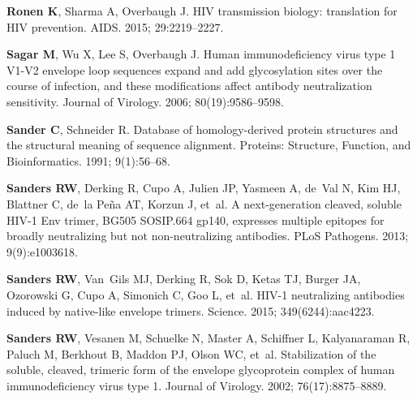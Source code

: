 \documentclass[9pt]{elife}
\begin{document}
\begin{thebibliography}{114}
\textbf{\color{eLifeMediumGrey} Ronen K}, Sharma A, Overbaugh J.
\newblock HIV transmission biology: translation for HIV prevention.
\newblock AIDS.  2015; 29:2219--2227.

\textbf{\color{eLifeMediumGrey} Sagar M}, Wu X, Lee S, Overbaugh J.
\newblock Human immunodeficiency virus type 1 {V1-V2} envelope loop sequences
  expand and add glycosylation sites over the course of infection, and these
  modifications affect antibody neutralization sensitivity.
\newblock Journal of Virology.  2006; 80(19):9586--9598.

\textbf{\color{eLifeMediumGrey} Sander C}, Schneider R.
\newblock Database of homology-derived protein structures and the structural
  meaning of sequence alignment.
\newblock Proteins: Structure, Function, and Bioinformatics.  1991;
  9(1):56--68.

\textbf{\color{eLifeMediumGrey} Sanders RW}, Derking R, Cupo A, Julien JP,
  Yasmeen A, de~Val N, Kim HJ, Blattner C, de~la Pe{\~n}a AT, Korzun J, et~al.
\newblock A next-generation cleaved, soluble {HIV-1} Env trimer, {BG505
  SOSIP.664 gp140}, expresses multiple epitopes for broadly neutralizing but
  not non-neutralizing antibodies.
\newblock PLoS Pathogens.  2013; 9(9):e1003618.

\textbf{\color{eLifeMediumGrey} Sanders RW}, Van~Gils MJ, Derking R, Sok D,
  Ketas TJ, Burger JA, Ozorowski G, Cupo A, Simonich C, Goo L, et~al.
\newblock HIV-1 neutralizing antibodies induced by native-like envelope
  trimers.
\newblock Science.  2015; 349(6244):aac4223.

\textbf{\color{eLifeMediumGrey} Sanders RW}, Vesanen M, Schuelke N, Master A,
  Schiffner L, Kalyanaraman R, Paluch M, Berkhout B, Maddon PJ, Olson WC,
  et~al.
\newblock Stabilization of the soluble, cleaved, trimeric form of the envelope
  glycoprotein complex of human immunodeficiency virus type 1.
\newblock Journal of Virology.  2002; 76(17):8875--8889.


\end{thebibliography}
\end{document}
